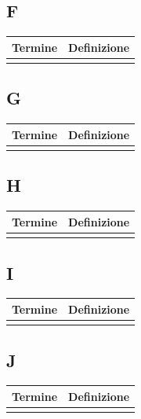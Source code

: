 \documentclass[10pt]{article}
\begin{document}
\subsection{F} %
\begin{tabularx}{\textwidth}{|>{\centering\arraybackslash}l|X|}
\hline
\rowcolor[gray]{0.8}
\textbf{Termine} & \textbf{Definizione}\\
\hline
 & \\
\hline
\end{tabularx}

\subsection{G} %
\begin{tabularx}{\textwidth}{|>{\centering\arraybackslash}l|X|}
\hline
\rowcolor[gray]{0.8}
\textbf{Termine} & \textbf{Definizione}\\
\hline
 & \\
\hline
\end{tabularx}

\subsection{H} %
\begin{tabularx}{\textwidth}{|>{\centering\arraybackslash}l|X|}
\hline
\rowcolor[gray]{0.8}
\textbf{Termine} & \textbf{Definizione}\\
\hline
 & \\
\hline
\end{tabularx}

\subsection{I} %
\begin{tabularx}{\textwidth}{|>{\centering\arraybackslash}l|X|}
\hline
\rowcolor[gray]{0.8}
\textbf{Termine} & \textbf{Definizione}\\
\hline
 & \\
\hline
\end{tabularx}

\subsection{J} %
\begin{tabularx}{\textwidth}{|>{\centering\arraybackslash}l|X|}
\hline
\rowcolor[gray]{0.8}
\textbf{Termine} & \textbf{Definizione}\\
\hline
 & \\
\hline
\end{tabularx}
\end{document}
